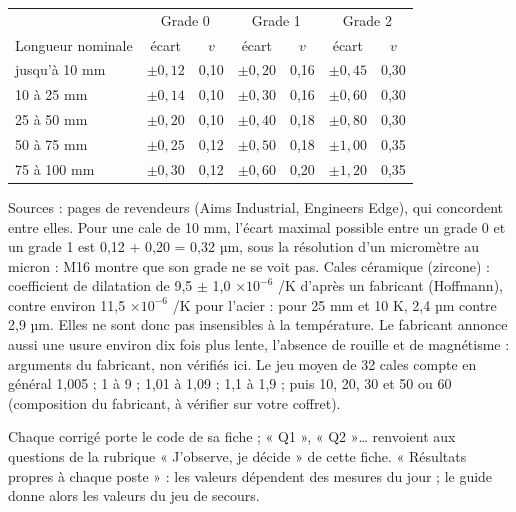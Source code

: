 \documentclass[10pt,a4paper]{article}
\begin{document}
\begin{center}\renewcommand{\arraystretch}{1.2}\small
\begin{tabular}{|l|cc|cc|cc|}\hline
 & \multicolumn{2}{c|}{Grade 0} & \multicolumn{2}{c|}{Grade 1} & \multicolumn{2}{c|}{Grade 2}\\
Longueur nominale & écart & $v$ & écart & $v$ & écart & $v$\\\hline
jusqu'à 10 mm & $\pm 0{,}12$ & 0,10 & $\pm 0{,}20$ & 0,16 & $\pm 0{,}45$ & 0,30\\
10 à 25 mm & $\pm 0{,}14$ & 0,10 & $\pm 0{,}30$ & 0,16 & $\pm 0{,}60$ & 0,30\\
25 à 50 mm & $\pm 0{,}20$ & 0,10 & $\pm 0{,}40$ & 0,18 & $\pm 0{,}80$ & 0,30\\
50 à 75 mm & $\pm 0{,}25$ & 0,12 & $\pm 0{,}50$ & 0,18 & $\pm 1{,}00$ & 0,35\\
75 à 100 mm & $\pm 0{,}30$ & 0,12 & $\pm 0{,}60$ & 0,20 & $\pm 1{,}20$ & 0,35\\\hline
\end{tabular}\end{center}
{\small Sources : pages de revendeurs (Aims Industrial, Engineers Edge), qui concordent entre elles. Pour une cale de 10 mm, l'écart maximal possible entre un grade 0 et un grade 1 est 0,12 + 0,20 = 0,32 µm, sous la résolution d'un micromètre au micron : M16 montre que son grade ne se voit pas. Cales céramique (zircone) : coefficient de dilatation de 9,5 $\pm$ 1,0 $\times 10^{-6}$ /K d'après un fabricant (Hoffmann), contre environ 11,5 $\times 10^{-6}$ /K pour l'acier : pour 25 mm et 10 K, 2,4 µm contre 2,9 µm. Elles ne sont donc pas insensibles à la température. Le fabricant annonce aussi une usure environ dix fois plus lente, l'absence de rouille et de magnétisme : arguments du fabricant, non vérifiés ici. Le jeu moyen de 32 cales compte en général 1,005 ; 1 à 9 ; 1,01 à 1,09 ; 1,1 à 1,9 ; puis 10, 20, 30 et 50 ou 60 (composition du fabricant, à vérifier sur votre coffret).}



\newpage
{}
{\small Chaque corrigé porte le code de sa fiche ; « Q1 », « Q2 »… renvoient aux questions de la rubrique « J'observe, je décide » de cette fiche. « Résultats propres à chaque poste » : les valeurs dépendent des mesures du jour ; le guide donne alors les valeurs du jeu de secours.}

\end{document}
